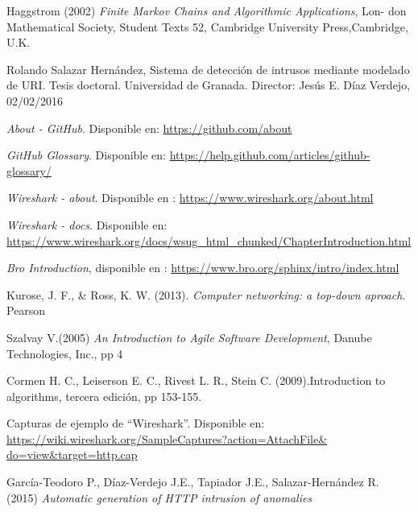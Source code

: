 \begin{thebibliography}{99}
Haggstrom (2002) \textit{Finite Markov Chains and Algorithmic Applications}, Lon-
don Mathematical Society, Student Texts 52, Cambridge University Press,Cambridge, U.K.

Rolando Salazar Hernández, Sistema de detección de intrusos mediante modelado de URI. Tesis doctoral. Universidad de Granada. Director: Jesús E. Díaz Verdejo, 02/02/2016

 \textit{About - GitHub}. Disponible en: \url{https://github.com/about}

 \textit{GitHub Glossary}. Disponible en: \url{https://help.github.com/articles/github-glossary/}

 \textit{Wireshark - about}. Disponible en : \url{https://www.wireshark.org/about.html}

 \textit{Wireshark - docs}. Disponible en: \url{https://www.wireshark.org/docs/wsug_html_chunked/ChapterIntroduction.html}

\textit{Bro Introduction}, disponible en : \url{https://www.bro.org/sphinx/intro/index.html}

Kurose, J. F., \& Ross, K. W. (2013). \textit{Computer networking: a top-down aproach}. Pearson

Szalvay V.(2005) \textit{An Introduction to Agile Software Development}, Danube Technologies, Inc., pp 4

 Cormen H. C., Leiserson E. C., Rivest L. R., Stein C. (2009).Introduction to algorithms, tercera edición, pp 153-155.

 Capturas de ejemplo de “Wireshark”. Disponible en:  \url{https://wiki.wireshark.org/SampleCaptures?action=AttachFile&
do=view&target=http.cap}

 García-Teodoro P., Díaz-Verdejo J.E., Tapiador J.E., Salazar-Hernández R. (2015) \textit{Automatic generation of HTTP intrusion of anomalies}

\end{thebibliography}